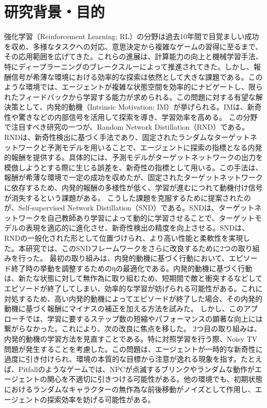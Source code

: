 \maketitle

\section{研究背景・目的}
強化学習（Reinforcement Learning; RL）の分野は過去10年間で目覚ましい成功を収め、多様なタスクへの対応、意思決定から複雑なゲームの習得に至るまで、その応用範囲を広げてきた。これらの進展は、計算能力の向上と機械学習手法、特にディープラーニングのブレークスルーによって推進されてきた。しかし、報酬信号が希薄な環境における効率的な探索は依然として大きな課題である。このような環境では、エージェントが複雑な状態空間を効率的にナビゲートし、限られたフィードバックから学習する能力が求められる。この問題に対する有望な解決策として、内発的動機（Intrinsic Motivation; IM）が挙げられる。IMは、新奇性や驚きなどの内部信号を活用して探索を導き、学習効率を高める。
この分野で注目すべき研究の一つが、Random Network Distillation（RND）である。RNDは、新奇性検出に基づく手法であり、固定されたランダムなターゲットネットワークと予測モデルを用いることで、エージェントに探索の指標となる内発的報酬を提供する。具体的には、予測モデルがターゲットネットワークの出力を模倣しようとする際に生じる誤差を、新奇性の指標として用いる。この手法は、報酬が希薄な環境で一定の成功を収めたが、固定されたターゲットネットワークに依存するため、内発的報酬の多様性が低く、学習が進むにつれて動機付け信号が消失するという課題がある。
こうした課題を克服するために提案されたのが、Self-supervised Network Distillation（SND）である。SNDは、ターゲットネットワークを自己教師あり学習によって動的に学習させることで、ターゲットモデルの表現を適応的に進化させ、新奇性検出の精度を向上させる。SNDは、RNDの一般化された形として位置づけられ、より高い性能と柔軟性を実現した。本研究では、このSNDフレームワークをさらに改良するために2つの取り組みを行った。
最初の取り組みは、内発的動機に基づく行動において、エピソード終了時の挙動を調整するためのηの最適化である。内発的動機に基づく行動は、新たな状態に対して無作為に取り組むため、短期間で敵と衝突するなどしてエピソードが終了してしまい、効率的な学習が妨げられる可能性がある。これに対処するため、高い内発的動機によってエピソードが終了した場合、その内発的動機に基づく報酬にマイナスの補正を加える方法を試みた。
しかし、このアプローチでは、学習に要するステップ数の短縮やパフォーマンスの顕著な向上には繋がらなかった。これにより、次の改良に焦点を移した。
2つ目の取り組みは、内発的動機の学習方法を見直すことである。特に対照学習を行う際、Noisy TV問題が発生することを考慮した。この問題は、エージェントが一時的な新奇性に過度に引き付けられ、環境の本質的な目標から注意が逸れる現象を指す。たとえば、Pitfallのようなゲームでは、NPCが点滅するブリンクやランダムな動作がエージェントの関心を不適切に引きつける可能性がある。他の環境でも、初期状態におけるランダムなキャラクターの無作為な前後移動がノイズとして作用し、エージェントの探索効率を妨げる可能性がある。

